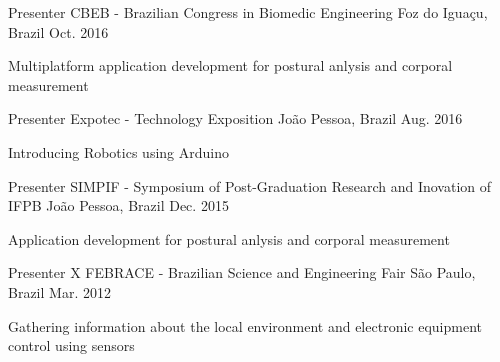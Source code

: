 \begin{cventries}
  \cventry
    {Presenter} %
    {CBEB - Brazilian Congress in Biomedic Engineering} %
    {Foz do Iguaçu, Brazil} %
    {Oct. 2016} %
    {
      \begin{cvitems} %
        \item {Multiplatform application development for postural anlysis and corporal measurement}
      \end{cvitems}
    }
\cventry
{Presenter} %
{Expotec - Technology Exposition} %
{João Pessoa, Brazil} %
{Aug. 2016} %
{
\begin{cvitems} %
\item {Introducing Robotics using Arduino}
\end{cvitems}
}
\cventry
{Presenter} %
{SIMPIF - Symposium of Post-Graduation Research and Inovation of IFPB} %
{João Pessoa, Brazil} %
{Dec. 2015} %
{
\begin{cvitems} %
\item {Application development for postural anlysis and corporal measurement}
\end{cvitems}
    }
  \cventry
    {Presenter} %
    {X FEBRACE - Brazilian Science and Engineering Fair} %
    {São Paulo, Brazil} %
    {Mar. 2012} %
    {
      \begin{cvitems} %
        \item {Gathering information about the local environment and electronic equipment control using sensors}
      \end{cvitems}
    }
\end{cventries}